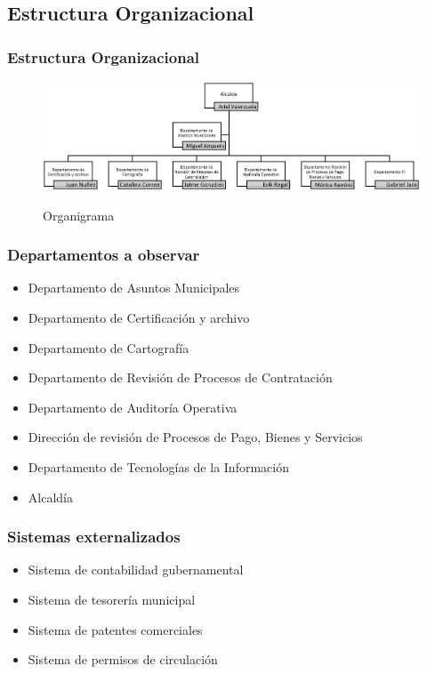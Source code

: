 \documentclass{beamer}
\begin{document}
\subsection{Estructura Organizacional}
\begin{frame}[c,fragile]
	\frametitle{Estructura Organizacional}


	\begin{figure}[H]
		\centering
		\includegraphics[width=1\textwidth]{../fragments/01structure/organigramaMunicipalidad.jpg}\\
	\caption{Organigrama}
	\label{FIG:ORGANIGRAMA}
	\end{figure}
	
\end{frame}

\begin{frame}[c,fragile]
	\frametitle{Departamentos a observar}
	\begin{itemize}
		\item{Departamento de Asuntos Municipales}
		\item{Departamento de Certificación y archivo}
		\item{Departamento de Cartografía }
		\item{Departamento de Revisión de Procesos de Contratación }
		\item{Departamento de Auditoría Operativa}
		\item{Dirección de revisión de Procesos de Pago, Bienes y Servicios}
		\item{Departamento de Tecnologías de la Información}
		\item{Alcaldía}
	\end{itemize}
\end{frame}


\begin{frame}[c,fragile]
	\frametitle{Sistemas externalizados}
	\begin{itemize}
		\item{Sistema de contabilidad gubernamental}
		\item{Sistema de tesorería municipal}
		\item{Sistema de patentes comerciales}
		\item{Sistema de permisos de circulación}
	\end{itemize}
\end{frame}
\end{document}
